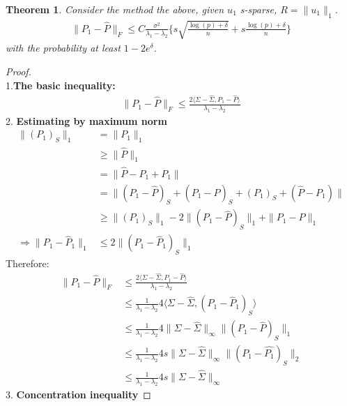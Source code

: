 \documentclass[a4paper,12pt, oneside, fleqn]{book}
\newtheorem{theorem}{Theorem}[section]
\theoremstyle{definition}
\theoremstyle{remark}
\begin{document}
\begin{theorem}
	Consider the method the above, given $u_1$ s-sparse, $R = \|u_1\|_1$.
	\begin{align*}
		\|P_1 - \hat{P}\|_F \le C \frac{\sigma^2}{\lambda_1 - \lambda_2}\bigg\{s \sqrt{{\frac{\log(p) + \delta}{n}}} + s \frac{\log(p) + \delta}{n} \bigg\} 
	\end{align*}
	with the probability at least $1 - 2e^\delta$.
\end{theorem}
\begin{proof}\quad\\
	1.\textbf{The basic inequality:}
	\begin{align*}
		\|P_1 - \hat{P}\|_F \le \frac{2\langle \Sigma - \hat{\Sigma}, P_1 - \hat{P}\rangle}{\lambda_1 - \lambda_2}
	\end{align*} 
	2. \textbf{Estimating by maximum norm}
	\begin{align*}
		\|(P_1)_S\|_1 &= \|P_1\|_1 \\
		&\ge \|\hat{P}\|_1\\
		&= \|\hat{P} - P_1 + P_1\|\\
		&= \| (P_1 - \hat{P})_S + (P_1 - \hat{P})_S + (P_1)_S + (\hat{P} - P_1)\|\\
		&\ge \|(P_1)_S\|_1 - 2\|(P_1 - \hat{P})_S\|_1 + \|P_1 - \hat{P}\|_1  \\
		\Rightarrow
		\|P_1 - \hat{P}_1\|_1 &\le 2 \|(P_1 - \hat{P}_1)_S\|_1
	\end{align*}
	Therefore:
	\begin{align*}
		\|P_1 - \hat{P}\|_F &\le \frac{2\langle \Sigma - \hat{\Sigma}, P_1 - \hat{P}\rangle}{\lambda_1 - \lambda_2}\\
		&\le \frac{1}{\lambda_1 - \lambda_2} 4\langle \Sigma- \hat{\Sigma}, (P_1 - \hat{P}_1)_S\rangle\\
		&\le \frac{1}{\lambda_1 - \lambda_2} 4 \|\Sigma - \hat{\Sigma}\|_\infty \|(P_1 - \hat{P})_S\|_1  \\
		&\le \frac{1}{\lambda_1 - \lambda_2} 4s \|\Sigma - \hat{\Sigma}\|_\infty \|(P_1 - \hat{P_1})_S\|_2\\
		&\le \frac{1}{\lambda_1 - \lambda_2} 4s \|\Sigma - \hat{\Sigma}\|_\infty		
	\end{align*}
	3. \textbf{Concentration inequality }
\end{proof}




\newpage
\end{document}

